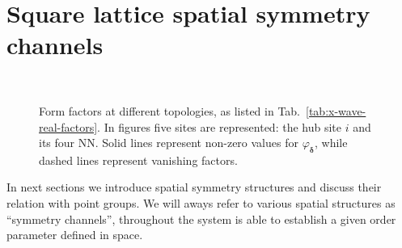 %

\section{Square lattice spatial symmetry channels}\label{sec:square-lattice-symmetries}

\begin{figure}[t]
	\centering
	\hspace{2em}
	\\[3em]
	\subfloat[$p_x$-wave.]{
		
		\label{subfig:px-wave-correlator}
	}
	\hspace{2em}
	\subfloat[$p_y$-wave.]{
		
		\label{subfig:py-wave-correlator}
	}
	\hspace{2em}
	\subfloat[$d_{x^2-y^2}$-wave.]{
		
		\label{subfig:d-wave-correlator}
	}
	\caption{Form factors at different topologies, as listed in Tab.~\ref{tab:x-wave-real-factors}. In figures five sites are represented: the hub site $i$ and its four NN. Solid lines represent non-zero values for $\varphi_{\bm{\delta}}$, while dashed lines represent vanishing factors.}
	\label{fig:x-wave-real-factors}
\end{figure}

In next sections we introduce spatial symmetry structures and discuss their relation with point groups. We will aways refer to various spatial structures as ``symmetry channels'', throughout the system is able to establish a given order parameter defined in space.

